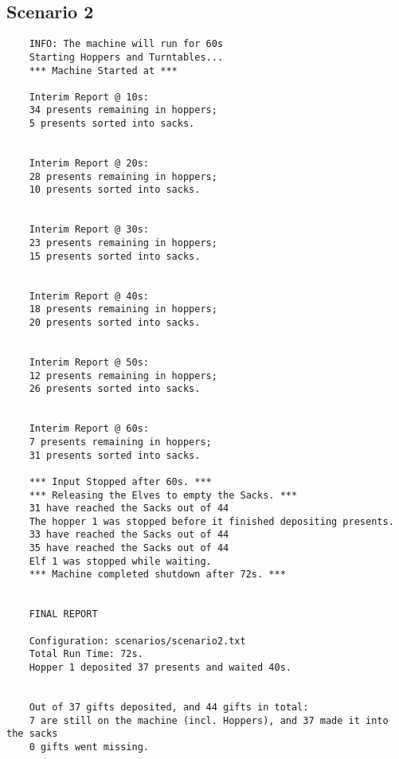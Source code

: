 \documentclass[a4paper,12pt]{article}
\begin{document}
    \subsection{Scenario 2}
    \begin{verbatim}
    INFO: The machine will run for 60s
    Starting Hoppers and Turntables...
    *** Machine Started at ***

    Interim Report @ 10s:
    34 presents remaining in hoppers;
    5 presents sorted into sacks.


    Interim Report @ 20s:
    28 presents remaining in hoppers;
    10 presents sorted into sacks.


    Interim Report @ 30s:
    23 presents remaining in hoppers;
    15 presents sorted into sacks.


    Interim Report @ 40s:
    18 presents remaining in hoppers;
    20 presents sorted into sacks.


    Interim Report @ 50s:
    12 presents remaining in hoppers;
    26 presents sorted into sacks.


    Interim Report @ 60s:
    7 presents remaining in hoppers;
    31 presents sorted into sacks.

    *** Input Stopped after 60s. ***
    *** Releasing the Elves to empty the Sacks. ***
    31 have reached the Sacks out of 44
    The hopper 1 was stopped before it finished depositing presents.
    33 have reached the Sacks out of 44
    35 have reached the Sacks out of 44
    Elf 1 was stopped while waiting.
    *** Machine completed shutdown after 72s. ***


    FINAL REPORT

    Configuration: scenarios/scenario2.txt
    Total Run Time: 72s.
    Hopper 1 deposited 37 presents and waited 40s.


    Out of 37 gifts deposited, and 44 gifts in total:
    7 are still on the machine (incl. Hoppers), and 37 made it into the sacks
    0 gifts went missing.
    \end{verbatim}
\end{document}
